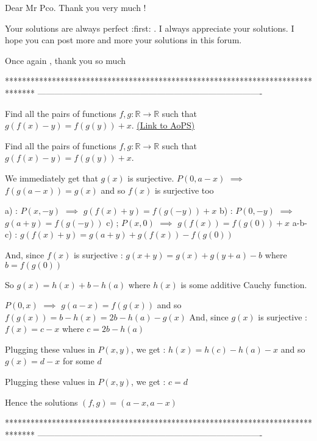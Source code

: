 \begin{solution}
	Dear Mr Pco. Thank you  very much ! 

Your solutions  are always perfect  :first: . I  always appreciate your solutions. I hope you can post more and more  your solutions in this forum.

Once again , thank you so much 
\end{solution}
*******************************************************************************
-------------------------------------------------------------------------------

\begin{problem}
	Find all the pairs of functions $f,g: \mathbb{R}\to\mathbb{R}$ such that $g(f(x)-y)=f(g(y))+x$.
	\flushright \href{https://artofproblemsolving.com/community/c6h559736}{(Link to AoPS)}
\end{problem}



\begin{solution}
	\begin{tcolorbox}Find all the pairs of functions $f,g: \mathbb{R}\to\mathbb{R}$ such that $g(f(x)-y)=f(g(y))+x$.\end{tcolorbox}
We immediately get that $g(x)$ is surjective.
$P(0,a-x)$ $\implies$ $f(g(a-x))=g(x)$ and so $f(x)$ is surjective too

a) : $P(x,-y)$ $\implies$ $g(f(x)+y)=f(g(-y))+x$
b) : $P(0,-y)$ $\implies$ $g(a+y)=f(g(-y))$
c) ; $P(x,0)$ $\implies$ $g(f(x))=f(g(0))+x$
a-b-c) : $g(f(x)+y)=g(a+y)+g(f(x))-f(g(0))$

And, since $f(x)$ is surjective : $g(x+y)=g(x)+g(y+a)-b$ where $b=f(g(0))$

So $g(x)=h(x)+b-h(a)$ where $h(x)$ is some additive Cauchy function.

$P(0,x)$ $\implies$ $g(a-x)=f(g(x))$ and so $f(g(x))=b-h(x)=2b-h(a)-g(x)$
And, since $g(x)$ is surjective : $f(x)=c-x$ where $c=2b-h(a)$

Plugging these values in $P(x,y)$, we get : $h(x)=h(c)-h(a)-x$ and so $g(x)=d-x$ for some $d$

Plugging these values in $P(x,y)$, we get : $c=d$

Hence the solutions $\boxed{(f,g)=(a-x,a-x)}$
\end{solution}
*******************************************************************************
-------------------------------------------------------------------------------


